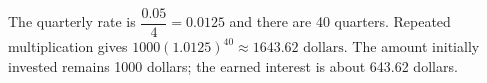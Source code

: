 The quarterly rate is $\dfrac{0.05}{4}=0.0125$ and there are 40 quarters. Repeated multiplication gives $1000(1.0125)^{40}\approx\boxed{1643.62\text{ dollars}}$. The amount initially invested remains 1000 dollars; the earned interest is about 643.62 dollars.
